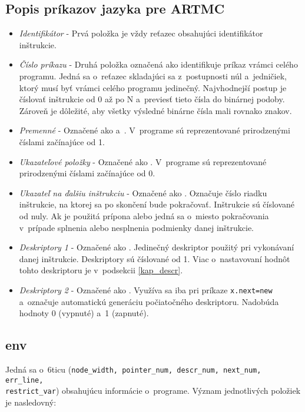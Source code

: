 \subsection{Popis príkazov jazyka pre ARTMC}
\begin{itemize}
    \item \textit{Identifikátor} - Prvá položka je vždy reťazec obsahujúci identifikátor inštrukcie.
    \item \textit{Číslo príkazu} - Druhá položka označená ako  identifikuje príkaz
        vrámci celého programu. Jedná sa o~reťazec skladajúci sa z~postupnosti
        núl a~jedničiek, ktorý musí byť vrámci celého  programu jedinečný.
        Najvhodnejší postup je číslovať inštrukcie od 0 až po N a~previesť tieto
        čísla do binárnej podoby. Zároveň je dôležité, aby všetky výsledné binárne čísla mali rovnako znakov.
    \item \textit{Premenné} - Označené ako  a~. V~programe sú reprezentované prirodzenými číslami začínajúce od 1.
    \item \textit{Ukazateľové položky} - Označené ako . V~programe sú reprezentované prirodzenými číslami začínajúce od 0.
    \item \textit{Ukazateľ na ďalšiu inštrukciu} - Označené ako . Označuje
        číslo riadku inštrukcie, na ktorej sa po skončení bude pokračovať. Inštrukcie
        sú číslované od nuly. Ak je použitá prípona  alebo 
        jedná sa o~miesto pokračovania v~prípade splnenia alebo nesplnenia podmienky danej inštrukcie.
    \item \textit{Deskriptory 1} - Označené ako . Jedinečný deskriptor použitý pri vykonávaní danej inštrukcie. Deskriptory sú číslované od 1. Viac o~nastavovaní hodnôt tohto deskriptoru je v~podsekcii \ref{kap_descr}.
    \item \textit{Deskriptory 2} - Označené ako . Využíva sa iba pri príkaze \texttt{x.next=new} a~označuje automatickú generáciu počiatočného deskriptoru. Nadobúda hodnoty 0 (vypnuté) a~1 (zapnuté).
\end{itemize}

\subsection{env}
Jedná sa o~6ticu (\texttt{node\_width, pointer\_num, descr\_num, next\_num, err\_line,\\ restrict\_var}) obsahujúcu informácie o~programe.
Význam jednotlivých položiek je nasledovný:

